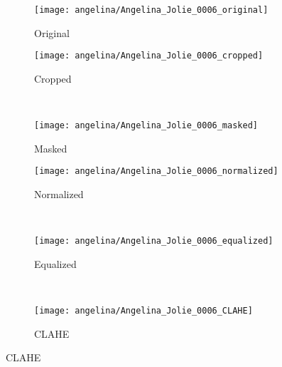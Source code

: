 \begin{figure}[t]
        \centering
        \begin{subfigure}[b]{0.2\textwidth}
                \centering
                \texttt{[image: angelina/Angelina\_Jolie\_0006\_original]}
                \caption{Original}
                \label{fig:original-original} 
        \end{subfigure}%
%

        \begin{subfigure}[b]{0.2\textwidth}
                \centering
                \texttt{[image: angelina/Angelina\_Jolie\_0006\_cropped]}
                \caption{Cropped}
                \label{fig:cropped} 
        \end{subfigure}
        ~ ~
        \begin{subfigure}[b]{0.2\textwidth}
                \centering
                \texttt{[image: angelina/Angelina\_Jolie\_0006\_masked]}
                \caption{Masked}
                \label{fig:masked}
        \end{subfigure}%
%

        \begin{subfigure}[b]{0.2\textwidth}
                \centering
                \texttt{[image: angelina/Angelina\_Jolie\_0006\_normalized]}
                \caption{Normalized}
                \label{fig:normalized} 
        \end{subfigure}
        ~ ~
        \begin{subfigure}[b]{0.2\textwidth}
                \centering
                \texttt{[image: angelina/Angelina\_Jolie\_0006\_equalized]}
                \caption{Equalized}
                \label{fig:equalized}
        \end{subfigure}
        ~ ~
        \begin{subfigure}[b]{0.2\textwidth}
                \centering
                \texttt{[image: angelina/Angelina\_Jolie\_0006\_CLAHE]}
                \caption{CLAHE}
                \label{fig:clahe}
        \end{subfigure}
        

\end{figure}

